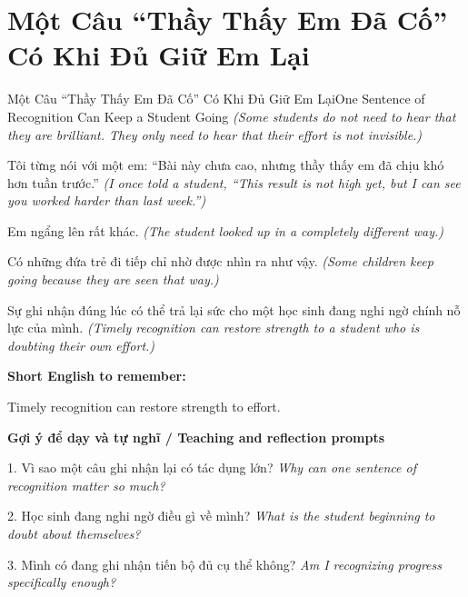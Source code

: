 \section{Một Câu “Thầy Thấy Em Đã Cố” Có Khi Đủ Giữ Em Lại}
\begin{truyen}{Một Câu “Thầy Thấy Em Đã Cố” Có Khi Đủ Giữ Em Lại}{One Sentence of Recognition Can Keep a Student Going}
\textit{(Some students do not need to hear that they are brilliant. They only need to hear that their effort is not invisible.)}

Tôi từng nói với một em: “Bài này chưa cao, nhưng thầy thấy em đã chịu khó hơn tuần trước.”
\textit{(I once told a student, “This result is not high yet, but I can see you worked harder than last week.”)}

Em ngẩng lên rất khác.
\textit{(The student looked up in a completely different way.)}

Có những đứa trẻ đi tiếp chỉ nhờ được nhìn ra như vậy.
\textit{(Some children keep going because they are seen that way.)}

\end{truyen}

\begin{baihoc}
Sự ghi nhận đúng lúc có thể trả lại sức cho một học sinh đang nghi ngờ chính nỗ lực của mình.
\textit{(Timely recognition can restore strength to a student who is doubting their own effort.)}
\end{baihoc}

\begin{ghinhoanh}
\textbf{Short English to remember:}

Timely recognition can restore strength to effort.

\end{ghinhoanh}

\begin{tuhocnhanh}
\textbf{Gợi ý để dạy và tự nghĩ / Teaching and reflection prompts}

1. Vì sao một câu ghi nhận lại có tác dụng lớn? \textit{Why can one sentence of recognition matter so much?}

2. Học sinh đang nghi ngờ điều gì về mình? \textit{What is the student beginning to doubt about themselves?}

3. Mình có đang ghi nhận tiến bộ đủ cụ thể không? \textit{Am I recognizing progress specifically enough?}
\end{tuhocnhanh}
\ngancach

